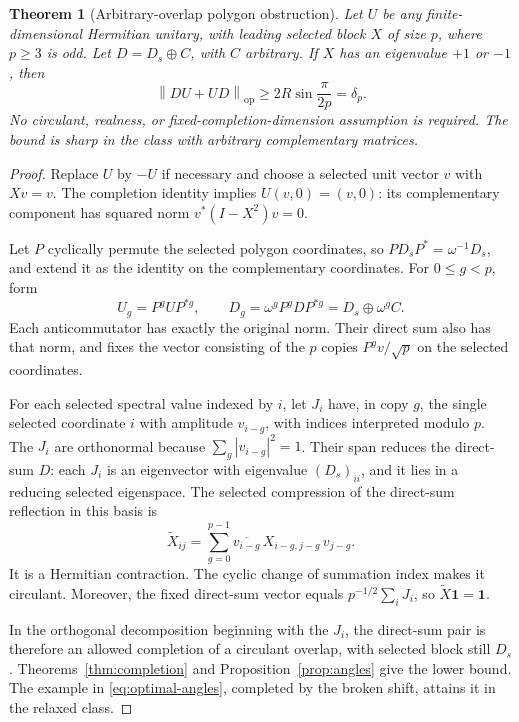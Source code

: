 \documentclass[11pt]{article}
\newtheorem{theorem}{Theorem}[section]
\theoremstyle{remark}
\newcommand{\op}{\mathrm{op}}
\newcommand{\norm}[1]{\left\lVert#1\right\rVert_{\op}}
\begin{document}
\begin{theorem}[Arbitrary-overlap polygon obstruction]\label{thm:polygon}
Let $U$ be any finite-dimensional Hermitian unitary, with leading selected block $X$ of size $p$, where $p\ge3$ is odd. Let $D=D_s\oplus C$, with $C$ arbitrary. If $X$ has an eigenvalue $+1$ or $-1$, then
\begin{equation}\label{eq:polygon-obstruction}
 \boxed{\quad\norm{DU+UD}\ge 2R\sin\frac\pi{2p}=\delta_p.\quad}
\end{equation}
No circulant, realness, or fixed-completion-dimension assumption is required. The bound is sharp in the class with arbitrary complementary matrices.
\end{theorem}
\begin{proof}
Replace $U$ by $-U$ if necessary and choose a selected unit vector $v$ with $Xv=v$. The completion identity implies $U(v,0)=(v,0)$: its complementary component has squared norm $v^*(I-X^2)v=0$.

Let $P$ cyclically permute the selected polygon coordinates, so $P D_sP^*=\omega^{-1}D_s$, and extend it as the identity on the complementary coordinates. For $0\le g<p$, form
\[
 U_g=P^gUP^{*g},\qquad D_g=\omega^gP^gDP^{*g}=D_s\oplus\omega^g C.
\]
Each anticommutator has exactly the original norm. Their direct sum also has that norm, and fixes the vector consisting of the $p$ copies $P^gv/\sqrt p$ on the selected coordinates.

For each selected spectral value indexed by $i$, let $J_i$ have, in copy $g$, the single selected coordinate $i$ with amplitude $v_{i-g}$, with indices interpreted modulo $p$. The $J_i$ are orthonormal because
$\sum_g|v_{i-g}|^2=1$. Their span reduces the direct-sum $D$: each $J_i$ is an eigenvector with eigenvalue $(D_s)_{ii}$, and it lies in a reducing selected eigenspace. The selected compression of the direct-sum reflection in this basis is
\begin{equation}\label{eq:twirl}
 \widetilde X_{ij}=\sum_{g=0}^{p-1}\overline{v_{i-g}}\,
 X_{i-g,j-g}\,v_{j-g}.
\end{equation}
It is a Hermitian contraction. The cyclic change of summation index makes it circulant. Moreover, the fixed direct-sum vector equals $p^{-1/2}\sum_iJ_i$, so $\widetilde X\mathbf1=\mathbf1$.

In the orthogonal decomposition beginning with the $J_i$, the direct-sum pair is therefore an allowed completion of a circulant overlap, with selected block still $D_s$. Theorems~\ref{thm:completion} and Proposition~\ref{prop:angles} give the lower bound. The example in \eqref{eq:optimal-angles}, completed by the broken shift, attains it in the relaxed class.
\end{proof}
\end{document}
